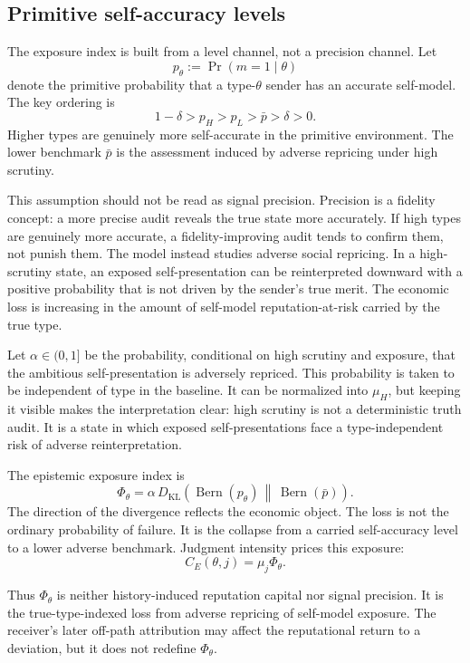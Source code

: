 \subsection{Primitive self-accuracy levels}

The exposure index is built from a level channel, not a precision channel. Let
\[
p_\theta:=\Pr(m=1\mid \theta)
\]
denote the primitive probability that a type-$\theta$ sender has an accurate self-model. The key ordering is
\[
1-\delta>p_H>p_L>\bar p>\delta>0.
\]
Higher types are genuinely more self-accurate in the primitive environment. The lower benchmark $\bar p$ is the assessment induced by adverse repricing under high scrutiny.

This assumption should not be read as signal precision. Precision is a fidelity concept: a more precise audit reveals the true state more accurately. If high types are genuinely more accurate, a fidelity-improving audit tends to confirm them, not punish them. The model instead studies adverse social repricing. In a high-scrutiny state, an exposed self-presentation can be reinterpreted downward with a positive probability that is not driven by the sender's true merit. The economic loss is increasing in the amount of self-model reputation-at-risk carried by the true type.

Let $\alpha\in(0,1]$ be the probability, conditional on high scrutiny and exposure, that the ambitious self-presentation is adversely repriced. This probability is taken to be independent of type in the baseline. It can be normalized into $\mu_H$, but keeping it visible makes the interpretation clear: high scrutiny is not a deterministic truth audit. It is a state in which exposed self-presentations face a type-independent risk of adverse reinterpretation.

The epistemic exposure index is
\[
\Phi_\theta
=
\alpha\,
D_{\mathrm{KL}}
\left(
\operatorname{Bern}(p_\theta)
\,\middle\|\,
\operatorname{Bern}(\bar p)
\right).
\]
The direction of the divergence reflects the economic object. The loss is not the ordinary probability of failure. It is the collapse from a carried self-accuracy level to a lower adverse benchmark. Judgment intensity prices this exposure:
\[
C_E(\theta,j)=\mu_j\Phi_\theta.
\]

Thus $\Phi_\theta$ is neither history-induced reputation capital nor signal precision. It is the true-type-indexed loss from adverse repricing of self-model exposure. The receiver's later off-path attribution may affect the reputational return to a deviation, but it does not redefine $\Phi_\theta$.


